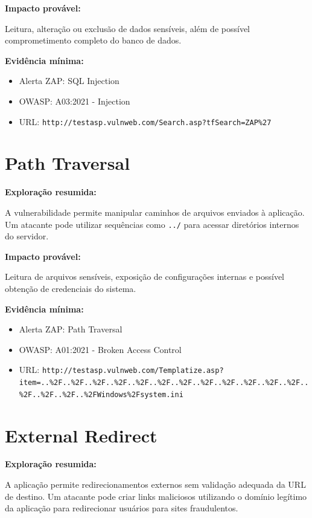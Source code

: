 \textbf{Impacto provável:}

Leitura, alteração ou exclusão de dados sensíveis, além de possível
comprometimento completo do banco de dados.

\textbf{Evidência mínima:}

\begin{itemize}
  \item Alerta ZAP: SQL Injection
  \item OWASP: A03:2021 - Injection
  \item URL: \texttt{http://testasp.vulnweb.com/Search.asp?tfSearch=ZAP\%27}
\end{itemize}

\section*{Path Traversal}

\textbf{Exploração resumida:}

A vulnerabilidade permite manipular caminhos de arquivos enviados à aplicação.
Um atacante pode utilizar sequências como \texttt{../} para acessar diretórios
internos do servidor.

\textbf{Impacto provável:}

Leitura de arquivos sensíveis, exposição de configurações internas e possível
obtenção de credenciais do sistema.

\textbf{Evidência mínima:}

\begin{itemize}
  \item Alerta ZAP: Path Traversal
  \item OWASP: A01:2021 - Broken Access Control
  \item URL:
    \texttt{http://testasp.vulnweb.com/Templatize.asp?item=..\%2F..\%2F..\%2F..\%2F..\%2F..\%2F..\%2F..\%2F..\%2F..\%2F..\%2F..\%2F..\%2F..\%2F..\%2F..\%2FWindows\%2Fsystem.ini}
\end{itemize}

\section*{External Redirect}

\textbf{Exploração resumida:}

A aplicação permite redirecionamentos externos sem validação adequada da URL de
destino. Um atacante pode criar links maliciosos utilizando o domínio legítimo
da aplicação para redirecionar usuários para sites fraudulentos.

